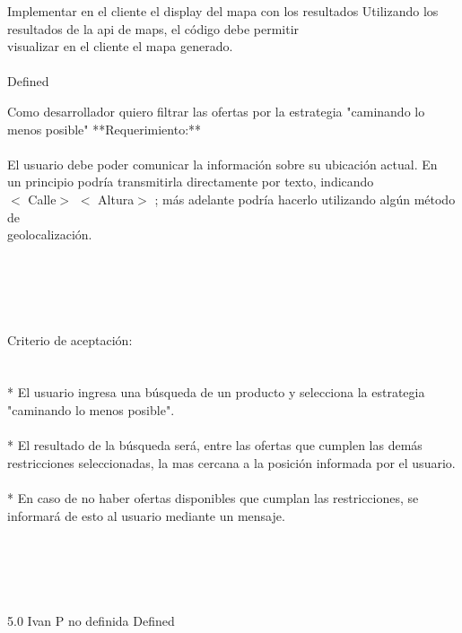 		{Implementar en el cliente el display del mapa con los resultados} %
		{Utilizando los resultados de la api de maps, el código debe permitir\\
visualizar en el cliente el mapa generado.\\
\\
} %
		{} %
		{} %
		{} %
		{Defined} %


\vspace{20pt}

	{Como desarrollador quiero filtrar las ofertas por la estrategia "caminando lo menos posible"} %
	{**Requerimiento:**\\
\\
El usuario debe poder comunicar la información sobre su ubicación actual. En\\
un principio podría transmitirla directamente por texto, indicando\\
$<$ Calle$>$ $<$ Altura$>$ ; más adelante podría hacerlo utilizando algún método de\\
geolocalización.\\
\\
  \\
\\
  \\
\\
Criterio de aceptación:\\
\\
  \\
* El usuario ingresa una búsqueda de un producto y selecciona la estrategia "caminando lo menos posible".  \\
\\
* El resultado de la búsqueda será, entre las ofertas que cumplen las demás restricciones seleccionadas, la mas cercana a la posición informada por el usuario.\\
\\
* En caso de no haber ofertas disponibles que cumplan las restricciones, se informará de esto al usuario mediante un mensaje. \\
\\
  \\
\\
  \\
\\
} %
	{} %
	{5.0} %
	{Ivan P} %
	{no definida} %
	{Defined} %


